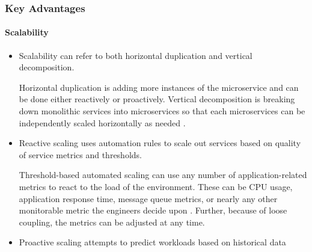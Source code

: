 \begin{frame}
  \frametitle{Key Advantages}
  \framesubtitle{Scalability}
  \begin{itemize}
    \item<1-> Scalability can refer to both horizontal duplication and vertical decomposition.

           {\scriptsize{Horizontal duplication is adding more instances of the microservice and can be done either reactively or proactively. Vertical decomposition is breaking down monolithic services into microservices so that each microservices can be independently scaled horizontally as needed \parencite{abbottArtScalabilityScalable2015,liUnderstandingAddressingQuality2021}.}}

    \item<2-> Reactive scaling uses automation rules to scale out services based on quality of service metrics and thresholds.

           {\scriptsize{Threshold-based automated scaling can use any number of application-related metrics to react to the load of the environment. These can be CPU usage, application response time, message queue metrics, or nearly any other monitorable metric the engineers decide upon \parencite{florimentklinakuCAUSElasticityController2018}. Further, because of loose coupling, the metrics can be adjusted at any time.}}

    \item<3-> Proactive scaling attempts to predict workloads based on historical data


  \end{itemize}
\end{frame}
